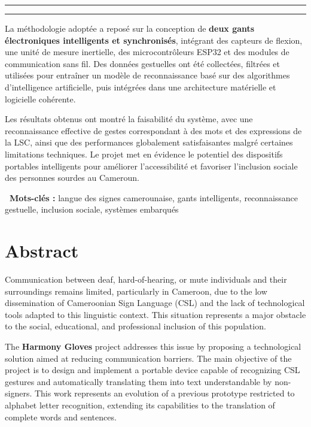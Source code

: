 \documentclass[11pt,a4paper]{report}
\newcommand{\concept}[1]{\textcolor{harmonyPrimary}{\textbf{#1}}}
\newcommand{\elegantsep}{\begin{center}\vspace{10pt}\textcolor{harmonyGray300}{\rule{0.2\textwidth}{0.5pt}\hspace{10pt}\textcolor{harmonyAccent}{\faDiamond}\hspace{10pt}\rule{0.2\textwidth}{0.5pt}}\vspace{10pt}\end{center}}
\begin{document}
\elegantsep

La méthodologie adoptée a reposé sur la conception de \concept{deux gants électroniques intelligents et synchronisés}, intégrant des capteurs de flexion, une unité de mesure inertielle, des microcontrôleurs ESP32 et des modules de communication sans fil. Des données gestuelles ont été collectées, filtrées et utilisées pour entraîner un modèle de reconnaissance basé sur des algorithmes d'intelligence artificielle, puis intégrées dans une architecture matérielle et logicielle cohérente.

Les résultats obtenus ont montré la faisabilité du système, avec une reconnaissance effective de gestes correspondant à des mots et des expressions de la LSC, ainsi que des performances globalement satisfaisantes malgré certaines limitations techniques. Le projet met en évidence le potentiel des dispositifs portables intelligents pour améliorer l'accessibilité et favoriser l'inclusion sociale des personnes sourdes au Cameroun.

\begin{processbox}
\textbf{\textcolor{harmonyPrimary}{\faTags\ Mots-clés :}} langue des signes camerounaise, gants intelligents, reconnaissance gestuelle, inclusion sociale, systèmes embarqués
\end{processbox}


\chapter*{Abstract}

\begin{infobox}
Communication between deaf, hard-of-hearing, or mute individuals and their surroundings remains limited, particularly in Cameroon, due to the low dissemination of Cameroonian Sign Language (CSL) and the lack of technological tools adapted to this linguistic context. This situation represents a major obstacle to the social, educational, and professional inclusion of this population.
\end{infobox}

\vspace{0.5cm}

The \concept{Harmony Gloves} project addresses this issue by proposing a technological solution aimed at reducing communication barriers. The main objective of the project is to design and implement a portable device capable of recognizing CSL gestures and automatically translating them into text understandable by non-signers. This work represents an evolution of a previous prototype restricted to alphabet letter recognition, extending its capabilities to the translation of complete words and sentences.
\end{document}
